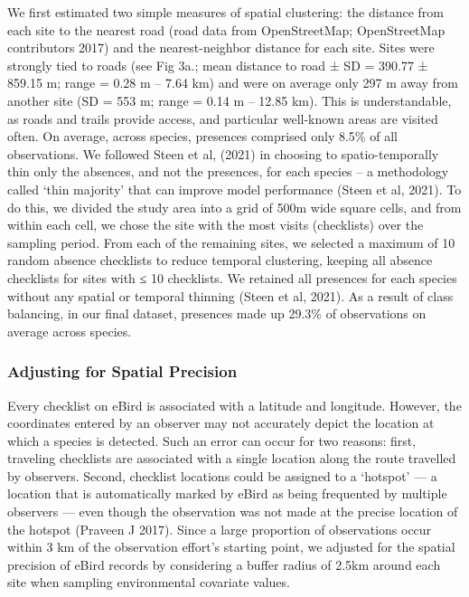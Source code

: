 We first estimated two simple measures of spatial clustering: the distance from each site to the nearest road (road data from OpenStreetMap; OpenStreetMap contributors 2017) and the nearest-neighbor distance for each site.
Sites were strongly tied to roads (see Fig 3a.; mean distance to road ± SD = 390.77 ± 859.15 m; range = 0.28 m – 7.64 km) and were on average only 297 m away from another site (SD = 553 m; range = 0.14 m – 12.85 km).
This is understandable, as roads and trails provide access, and particular well-known areas are visited often.
On average, across species, presences comprised only 8.5\% of all observations.
We followed Steen et al, (2021) in choosing to spatio-temporally thin only the absences, and not the presences, for each species – a methodology called `thin majority' that can improve model performance (Steen et al, 2021).
To do this, we divided the study area into a grid of 500m wide square cells, and from within each cell, we chose the site with the most visits (checklists) over the sampling period.
From each of the remaining sites, we selected a maximum of 10 random absence checklists to reduce temporal clustering, keeping all absence checklists for sites with ≤ 10 checklists.
We retained all presences for each species without any spatial or temporal thinning (Steen et al, 2021).
As a result of class balancing, in our final dataset, presences made up 29.3\% of observations on average across species.

\subsubsection*{Adjusting for Spatial Precision}

Every checklist on eBird is associated with a latitude and longitude.
However, the coordinates entered by an observer may not accurately depict the location at which a species is detected.
Such an error can occur for two reasons: first, traveling checklists are associated with a single location along the route travelled by observers.
Second, checklist locations could be assigned to a `hotspot' --- a location that is automatically marked by eBird as being frequented by multiple observers --- even though the observation was not made at the precise location of the hotspot (Praveen J 2017).
Since a large proportion of observations occur within 3 km of the observation effort's starting point, we adjusted for the spatial precision of eBird records by considering a buffer radius of 2.5km around each site when sampling environmental covariate values.

